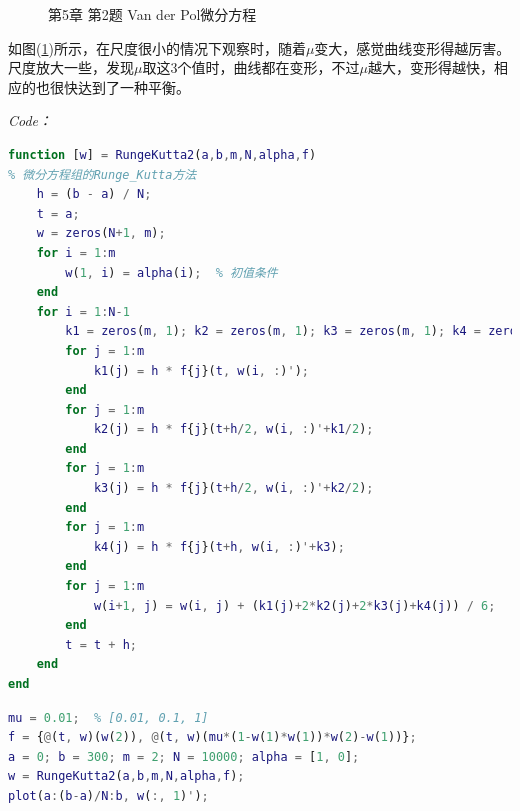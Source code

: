 \documentclass[12pt]{ctexart}
\begin{document}
\begin{figure}[htbp]
{		} \quad
		\caption{第5章 第2题 Van der Pol微分方程}\label{e5_2}
	\end{figure}
	
	如图(\ref{e5_2})所示，在尺度很小的情况下观察时，随着$\mu$变大，感觉曲线变形得越厉害。尺度放大一些，发现$\mu$取这3个值时，曲线都在变形，不过$\mu$越大，变形得越快，相应的也很快达到了一种平衡。
	
	\textit{Code：}

\begin{lstlisting}[language = MATLAB]
function [w] = RungeKutta2(a,b,m,N,alpha,f)
% 微分方程组的Runge_Kutta方法
	h = (b - a) / N;
	t = a;
	w = zeros(N+1, m);
	for i = 1:m
		w(1, i) = alpha(i);  % 初值条件
	end
	for i = 1:N-1
		k1 = zeros(m, 1); k2 = zeros(m, 1); k3 = zeros(m, 1); k4 = zeros(m, 1);
		for j = 1:m
			k1(j) = h * f{j}(t, w(i, :)');
		end
		for j = 1:m
			k2(j) = h * f{j}(t+h/2, w(i, :)'+k1/2);
		end
		for j = 1:m
			k3(j) = h * f{j}(t+h/2, w(i, :)'+k2/2);
		end
		for j = 1:m
			k4(j) = h * f{j}(t+h, w(i, :)'+k3);
		end
		for j = 1:m
			w(i+1, j) = w(i, j) + (k1(j)+2*k2(j)+2*k3(j)+k4(j)) / 6;
		end
		t = t + h;
	end
end
\end{lstlisting}

\begin{lstlisting}[language = MATLAB]
% 第5章 第2题
mu = 0.01;  % [0.01, 0.1, 1]
f = {@(t, w)(w(2)), @(t, w)(mu*(1-w(1)*w(1))*w(2)-w(1))};
a = 0; b = 300; m = 2; N = 10000; alpha = [1, 0];
w = RungeKutta2(a,b,m,N,alpha,f);
plot(a:(b-a)/N:b, w(:, 1)');
\end{lstlisting}
\end{document}

